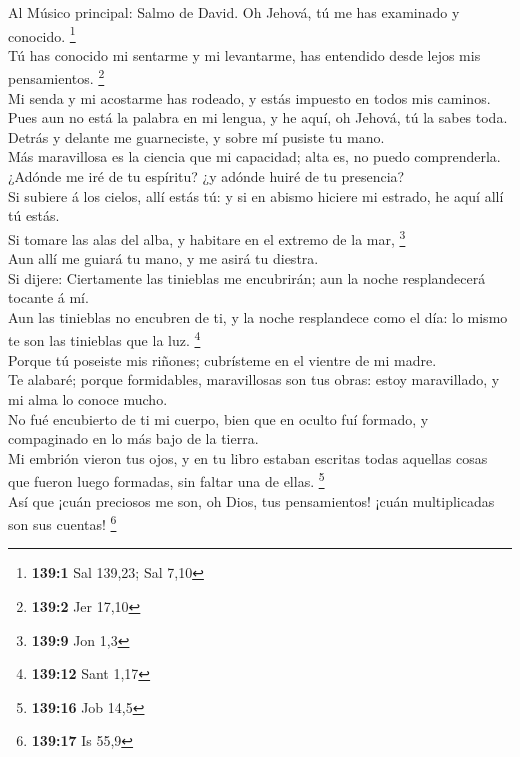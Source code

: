  Al Músico principal: Salmo de David. Oh Jehová, tú me has
examinado y conocido. \footnote{\textbf{139:1} Sal 139,23; Sal 7,10}\\
 Tú has conocido mi sentarme y mi levantarme, has entendido
desde lejos mis pensamientos. \footnote{\textbf{139:2} Jer 17,10}\\
 Mi senda y mi acostarme has rodeado, y estás impuesto en
todos mis caminos.\\
 Pues aun no está la palabra en mi lengua, y he aquí, oh
Jehová, tú la sabes toda.\\
 Detrás y delante me guarneciste, y sobre mí pusiste tu
mano.\\
 Más maravillosa es la ciencia que mi capacidad; alta es, no
puedo comprenderla.\\
 ¿Adónde me iré de tu espíritu? ¿y adónde huiré de tu
presencia?\\
 Si subiere á los cielos, allí estás tú: y si en abismo
hiciere mi estrado, he aquí allí tú estás.\\
 Si tomare las alas del alba, y habitare en el extremo de la
mar, \footnote{\textbf{139:9} Jon 1,3}\\
 Aun allí me guiará tu mano, y me asirá tu diestra.\\
 Si dijere: Ciertamente las tinieblas me encubrirán; aun la
noche resplandecerá tocante á mí.\\
 Aun las tinieblas no encubren de ti, y la noche
resplandece como el día: lo mismo te son las tinieblas que la luz.
\footnote{\textbf{139:12} Sant 1,17}\\
 Porque tú poseiste mis riñones; cubrísteme en el vientre
de mi madre.\\
 Te alabaré; porque formidables, maravillosas son tus
obras: estoy maravillado, y mi alma lo conoce mucho.\\
 No fué encubierto de ti mi cuerpo, bien que en oculto fuí
formado, y compaginado en lo más bajo de la tierra.\\
 Mi embrión vieron tus ojos, y en tu libro estaban escritas
todas aquellas cosas que fueron luego formadas, sin faltar una de ellas.
\footnote{\textbf{139:16} Job 14,5}\\
 Así que ¡cuán preciosos me son, oh Dios, tus pensamientos!
¡cuán multiplicadas son sus cuentas! \footnote{\textbf{139:17} Is 55,9}\\
